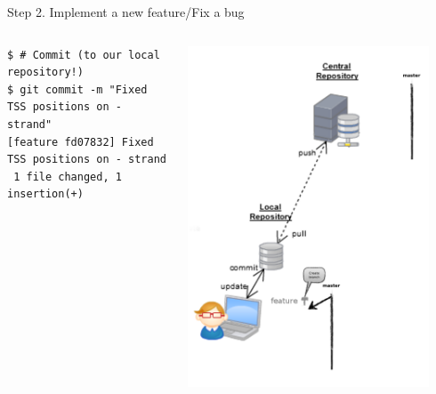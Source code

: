 \begin{frame}[fragile]{Step 2. Implement a new feature/Fix a bug}
\begin{columns}
\begin{column}{0.6\textwidth}
\begin{lstlisting}
$ # Commit (to our local repository!)
$ git commit -m "Fixed TSS positions on - strand"
[feature fd07832] Fixed TSS positions on - strand
 1 file changed, 1 insertion(+) 
  	\end{lstlisting}
  	\end{column}
	\begin{column}{0.4\textwidth}
		\begin{center}
			 {
				\includegraphics[width=0.9\textwidth]{branch_created.png}
			} \only<3-> {
}
\end{center}
\end{column}
\end{columns}
\end{frame}
